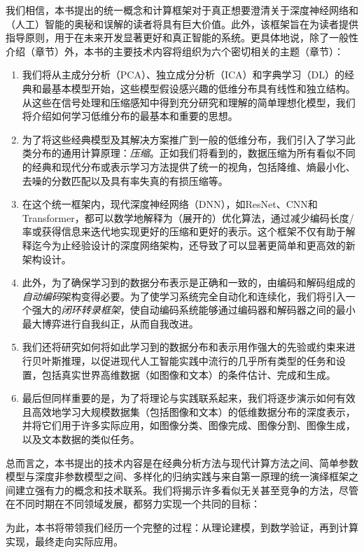 \documentclass[../../book-main_zh.tex]{subfiles}
\begin{document}
我们相信，本书提出的统一概念和计算框架对于真正想要澄清关于深度神经网络和（人工）智能的奥秘和误解的读者将具有巨大价值。此外，该框架旨在为读者提供指导原则，用于在未来开发显著更好和真正智能的系统。更具体地说，除了一般性介绍（章节）外，本书的主要技术内容将组织为六个密切相关的主题（章节）：
\begin{enumerate}
\item 我们将从主成分分析（PCA）、独立成分分析（ICA）和字典学习（DL）的经典和最基本模型开始，这些模型假设感兴趣的低维分布具有线性和独立结构。从这些在信号处理和压缩感知中得到充分研究和理解的简单理想化模型，我们将介绍如何学习低维分布的最基本和重要的思想。

\item 为了将这些经典模型及其解决方案推广到一般的低维分布，我们引入了学习此类分布的通用计算原理：{\em 压缩}。正如我们将看到的，数据压缩为所有看似不同的经典和现代分布或表示学习方法提供了统一的视角，包括降维、熵最小化、去噪的分数匹配以及具有率失真的有损压缩等。

\item 在这个统一框架内，现代深度神经网络（DNN），如ResNet、CNN和Transformer，都可以数学地解释为（展开的）优化算法，通过减少编码长度/率或获得信息来迭代地实现更好的压缩和更好的表示。这个框架不仅有助于解释迄今为止经验设计的深度网络架构，还导致了可以显著更简单和更高效的新架构设计。

\item 此外，为了确保学习到的数据分布表示是正确和一致的，由编码和解码组成的{\em 自动编码}架构变得必要。为了使学习系统完全自动化和连续化，我们将引入一个强大的{\em 闭环转录框架}，使自动编码系统能够通过编码器和解码器之间的最小最大博弈进行自我纠正，从而自我改进。

\item 我们还将研究如何将如此学习到的数据分布和表示用作强大的先验或约束来进行贝叶斯推理，以促进现代人工智能实践中流行的几乎所有类型的任务和设置，包括真实世界高维数据（如图像和文本）的条件估计、完成和生成。

\item 最后但同样重要的是，为了将理论与实践联系起来，我们将逐步演示如何有效且高效地学习大规模数据集（包括图像和文本）的低维数据分布的深度表示，并将它们用于许多实际应用，如图像分类、图像完成、图像分割、图像生成，以及文本数据的类似任务。
\end{enumerate}

总而言之，本书提出的技术内容是在经典分析方法与现代计算方法之间、简单参数模型与深度非参数模型之间、多样化的归纳实践与来自第一原理的统一演绎框架之间建立强有力的概念和技术联系。我们将揭示许多看似无关甚至竞争的方法，尽管在不同时期在不同领域发展，都努力实现一个共同的目标：
\begin{quote}
\end{quote}
为此，本书将带领我们经历一个完整的过程：从理论建模，到数学验证，再到计算实现，最终走向实际应用。
\end{document}
